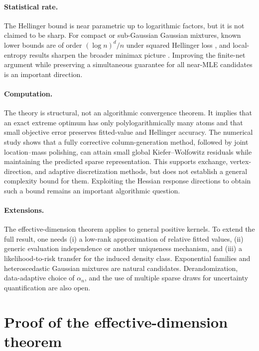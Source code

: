 \documentclass[11pt]{article}
\theoremstyle{definition}
\theoremstyle{remark}
\begin{document}
\paragraph{Statistical rate.}
The Hellinger bound is near parametric up to logarithmic factors, but it is not
claimed to be sharp.  For compact or sub-Gaussian Gaussian mixtures, known
lower bounds are of order $(\log n)^d/n$ under squared Hellinger loss
\citep{kimguntuboyina2022}, and local-entropy results sharpen the broader
minimax picture \citep{jiaetal2023}.  Improving the finite-net argument while
preserving a simultaneous guarantee for all near-MLE candidates is an
important direction.

\paragraph{Computation.}
The theory is structural, not an algorithmic convergence theorem.  It implies
that an exact extreme optimum has only polylogarithmically many atoms and that
small objective error preserves fitted-value and Hellinger accuracy.  The
numerical study shows that a fully corrective column-generation method,
followed by joint location--mass polishing, can attain small global
Kiefer--Wolfowitz residuals while maintaining the predicted sparse
representation.  This supports exchange, vertex-direction, and adaptive
discretization methods, but does not establish a general complexity bound for
them.  Exploiting the Hessian response directions to obtain such a bound
remains an important algorithmic question.

\paragraph{Extensions.}
The effective-dimension theorem applies to general positive kernels.  To
extend the full result, one needs (i) a low-rank approximation of relative
fitted values, (ii) generic evaluation independence or another uniqueness
mechanism, and (iii) a likelihood-to-risk transfer for the induced density
class.  Exponential families and heteroscedastic Gaussian mixtures are natural
candidates.  Derandomization, data-adaptive choice of $\alpha_n$, and the use
of multiple sparse draws for uncertainty quantification are also open.

\appendix

\section{Proof of the effective-dimension theorem}
\label{app:effective}
\end{document}
